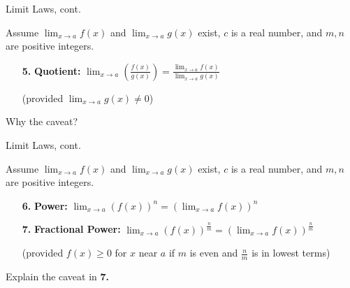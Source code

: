 \documentclass[cal1spr16Lectures.tex]{subfiles}
\begin{document}
\begin{frame}{\small Limit Laws, cont.}{}
{\footnotesize Assume $\lim_{x \to a} f(x)$ and $\lim_{x \to a} g(x)$ exist, $c$ is a real number, and $m,n$ are positive integers.

\hrulefill
}
\begin{itemize}
\item[{\bf 5.}] {\bf Quotient:}  $\lim_{x \to a} \left(\frac{f(x)}{g(x)} \right) = \frac{\displaystyle\lim_{x \to a} f(x)}{\displaystyle\lim_{x \to a} g(x)}$

\vspace{1pc}
(provided $\lim_{x \to a} g(x) \ne 0$)
\end{itemize}

\begin{que}Why the caveat? \end{que}
\end{frame}

\begin{frame}{\small Limit Laws, cont.}{}\footnotesize
{\footnotesize Assume $\lim_{x \to a} f(x)$ and $\lim_{x \to a} g(x)$ exist, $c$ is a real number, and $m,n$ are positive integers.

\hrulefill
}
\begin{itemize}
\item[{\bf 6.}] {\bf Power:} $\lim_{x \to a}\left(f(x)\right)^n = \left( \lim_{x \to a} f(x) \right)^n$

\vspace{0.4pc}
\item[{\bf 7.}] {\bf Fractional Power:} $\lim_{x \to a} \left(f(x)\right)^{\frac{n}{m}} = \left( \lim_{x \to a} f(x) \right)^{\frac{n}{m}}$ 

\vspace{0.2pc}
(provided $f(x) \ge 0$ for $x$ near $a$ if $m$ is even and $\textstyle\frac{n}{m}$ is in lowest terms)
\end{itemize}

\vspace{-0.3pc}
\begin{que}Explain the caveat in {\bf 7.} \end{que}
\end{frame}
\end{document}
